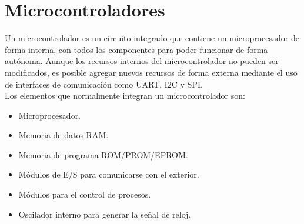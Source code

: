 	\section{Microcontroladores}
	Un microcontrolador es  un  circuito  integrado  que  contiene  un  microprocesador  de  forma  interna,  con  todos  los  componentes  para  poder  funcionar  de  forma  autónoma. Aunque los recursos internos del microcontrolador no pueden ser modificados, es posible agregar nuevos recursos de forma externa mediante el uso de interfaces de comunicación como UART, I2C y SPI.\\
	
	Los  elementos  que  normalmente  integran  un  microcontrolador  son:
	\begin{itemize}
		\item Microprocesador.
		\item Memoria  de  datos  RAM.
		\item Memoria  de  programa  ROM/PROM/EPROM.
		\item Módulos  de  E/S  para  comunicarse  con  el  exterior.
		\item Módulos  para  el  control  de  procesos.
		\item Oscilador  interno  para  generar  la  señal  de  reloj.
	\end{itemize}

	